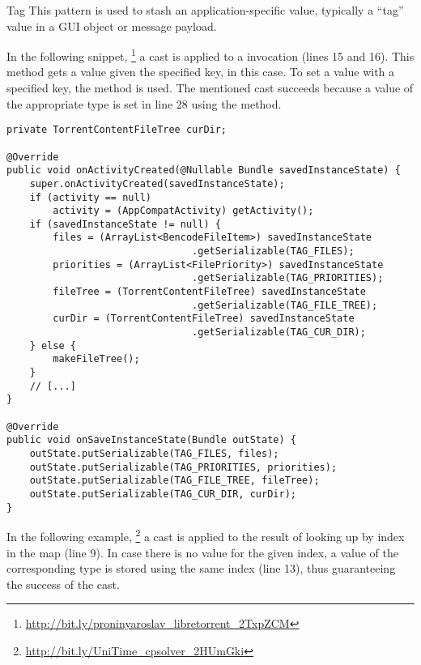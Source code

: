 \begin{pattern}{Tag}
This pattern is used to stash an application-specific value,
typically a ``tag'' value in a GUI object or message payload.

\instances{}
In the following snippet,%
\footnote{\url{http://bit.ly/proninyaroslav_libretorrent_2TxpZCM}}
a cast is applied to a  invocation (lines 15 and 16).
This method gets a  value given the specified key,  in this case.
To set a value with a specified key, the  method is used.
The mentioned cast succeeds because a value of the appropriate type is set in line 28 using the  method.

\begin{verbatim}
private TorrentContentFileTree curDir;

@Override
public void onActivityCreated(@Nullable Bundle savedInstanceState) {
    super.onActivityCreated(savedInstanceState);
    if (activity == null)
        activity = (AppCompatActivity) getActivity();
    if (savedInstanceState != null) {
        files = (ArrayList<BencodeFileItem>) savedInstanceState
                                .getSerializable(TAG_FILES);
        priorities = (ArrayList<FilePriority>) savedInstanceState
                                .getSerializable(TAG_PRIORITIES);
        fileTree = (TorrentContentFileTree) savedInstanceState
                                .getSerializable(TAG_FILE_TREE);
        curDir = (TorrentContentFileTree) savedInstanceState
                                .getSerializable(TAG_CUR_DIR);
    } else {
        makeFileTree();
    }
    // [...]
}

@Override
public void onSaveInstanceState(Bundle outState) {
    outState.putSerializable(TAG_FILES, files);
    outState.putSerializable(TAG_PRIORITIES, priorities);
    outState.putSerializable(TAG_FILE_TREE, fileTree);
    outState.putSerializable(TAG_CUR_DIR, curDir);
}
\end{verbatim}

In the following example,%
\footnote{\url{http://bit.ly/UniTime_cpsolver_2HUmGki}}
a cast is applied to the result of looking up by index in the  map (line 9).
In case there is no value for the given index,
a value of the corresponding type is stored using the same index (line 13),
thus guaranteeing the success of the cast.


\end{pattern}
